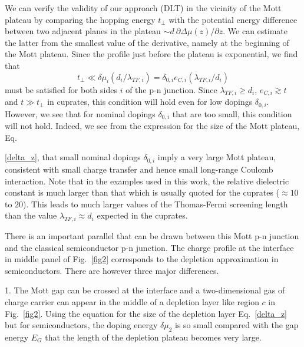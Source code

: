 \documentclass[twocolumn, preprintnumbers,prb,aps,amssymb,showpacs]{revtex4}
\begin{document}
We can verify the validity of our approach (DLT) in the vicinity of the Mott plateau by comparing the hopping energy $t_{\perp}$ with the potential energy difference between two adjacent planes in the plateau $\sim d~\partial\Delta\mu (z)/\partial z$. We can estimate the latter from the smallest value of the derivative, namely at the beginning of the Mott plateau. Since the profile just before the plateau is exponential, we find that
\begin{equation}
t_{\perp} \ll \delta \mu_i (d_i / \lambda_{TF,i}) = \delta_{0,i} e_{C,i} (\lambda_{TF,i} / d_i) \label{condition_approx}
\end{equation}%
must be satisfied for both sides $i$ of the p-n junction. Since $\lambda_{TF,i} \geqslant d_i$, $e_{C,i} \gtrsim t$ and $t \gg t_{\perp}$ in cuprates, this condition will hold even for low dopings $\delta_{0,i}$. However, we see that for nominal dopings $\delta_{0,i}$ that are too small, this condition will not hold. Indeed, we see from the expression for the size of the Mott plateau, Eq.{\eqref{delta_z}, that small nominal dopings $\delta_{0,i}$ imply a very large Mott plateau, consistent with small charge transfer and hence small long-range Coulomb interaction. Note that in the examples used in this work, the relative dielectric constant is much larger than that which is usually quoted for the cuprates ($\approx 10$ to $20$). This leads to much larger values of the Thomas-Fermi screening length than the value $\lambda_{TF,i} \approx d_i$ expected in the cuprates.~\cite{logvenov_high-temperature_2009}

There is an important parallel that can be drawn between this Mott p-n
junction and the classical semiconductor p-n junction. The charge profile at
the interface in middle panel of Fig.~\ref{fig2} corresponds to the depletion
approximation in semiconductors. There are however three major differences.

1. The Mott gap can be crossed at the interface and a two-dimensional gas
of charge carrier can appear in the middle of a depletion layer like region $%
c$ in Fig.~\ref{fig2}. Using the equation for the size of the depletion layer Eq.~\eqref{delta_z} but for semiconductors,
the doping energy $\delta \mu_2$ is so small compared with the gap energy $%
E_G$ that the length of the depletion plateau becomes very large.

}
\end{document}
